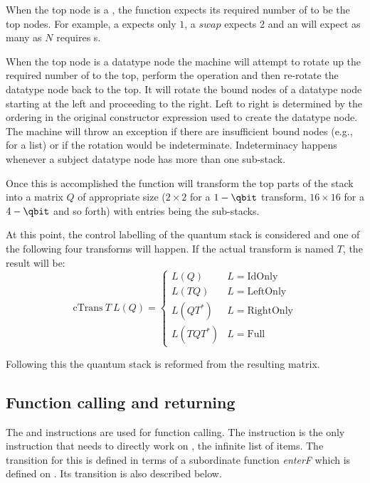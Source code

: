 When the top node is a \qbit, the function expects its required number
of \qbits{} to be the top nodes. For example, a \Had{} expects only $1$, a 
$swap$ expects 2 and an 
 will expect as many \qbits{} as $N$ requires
\bit{}s.

When the top node is a datatype node the machine will attempt to rotate up the 
required number of \qbits{} to the top, perform the operation and 
then re-rotate the datatype node back to the top. It will rotate the bound 
nodes of a datatype node starting at the 
 left and proceeding to the  right. Left to right is determined by the 
 ordering in the original constructor expression used to create
the datatype node. The machine will throw 
an exception if  there are insufficient bound nodes (e.g., 
 for a list) or if the rotation would be indeterminate. 
Indeterminacy happens whenever a subject datatype node has more than one
sub-stack.

Once this is accomplished the function will transform the top parts of
the stack into a matrix $Q$ of appropriate size ($2\times2$ for a $1-\qbit$ 
transform, $16\times16$ for a $4-\qbit$ and so forth) with entries
being the sub-stacks. 

At this point, the control labelling 
of the quantum stack is considered and one of
the following four transforms will happen. If the actual transform
is named $T$, the result will be:
\begin{equation}
\mathrm{cTrans}\ T\ L(Q) =
\begin{cases}
L(Q) & L= \mathrm{IdOnly}\\
L(T Q) & L= \mathrm{LeftOnly}\\
L(Q T^{*}) & L= \mathrm{RightOnly}\\
L(T Q T^{*}) & L= \mathrm{Full}
\end{cases}
\end{equation}

Following this the quantum stack is reformed from the resulting 
matrix. 

\subsection{Function calling and returning}\label{subsec:functioncalling}
The  and  instructions are used for 
function calling.
The  instruction is the only instruction that needs to 
directly work on \ms, the infinite list of \cms{} items. The transition
for this is defined in terms of a subordinate function \emph{enterF}
 which is 
defined on \bms. Its transition is also described below.

